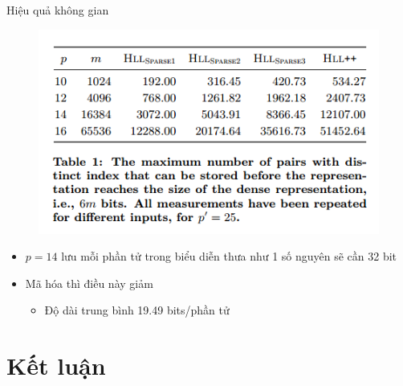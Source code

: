 \documentclass{beamer}
\begin{document}
\begin{frame}{Hiệu quả không gian}
\begin{figure}[H]
\includegraphics[scale=0.6]{img3.png}
\end{figure}
\begin{itemize}
\item $p = 14$ lưu mỗi phần tử trong biểu diễn thưa như 1 số nguyên sẽ cần 32 bit
\item Mã hóa thì điều này giảm 
\begin{itemize}
\item Độ dài trung bình 19.49 bits/phần tử
\end{itemize}
\end{itemize}
\end{frame}
\section{Kết luận}
\end{document}
